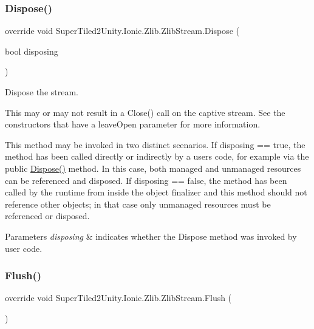 \subsubsection{\texorpdfstring{Dispose()}{Dispose()}}
{\footnotesize\ttfamily override void Super\+Tiled2\+Unity.\+Ionic.\+Zlib.\+Zlib\+Stream.\+Dispose (\begin{DoxyParamCaption}\item[{bool}]{disposing }\end{DoxyParamCaption})\hspace{0.3cm}{\ttfamily [protected]}}



Dispose the stream. 

This may or may not result in a {\ttfamily Close()} call on the captive stream. See the constructors that have a {\ttfamily leave\+Open} parameter for more information. 

This method may be invoked in two distinct scenarios. If disposing == true, the method has been called directly or indirectly by a user\textquotesingle{}s code, for example via the public \mbox{\hyperlink{class_super_tiled2_unity_1_1_ionic_1_1_zlib_1_1_zlib_stream_ae7e46e815fe6d5cd5777c4388a096ca2}{Dispose()}} method. In this case, both managed and unmanaged resources can be referenced and disposed. If disposing == false, the method has been called by the runtime from inside the object finalizer and this method should not reference other objects; in that case only unmanaged resources must be referenced or disposed. 


\begin{DoxyParams}{Parameters}
{\em disposing} & indicates whether the Dispose method was invoked by user code. \\
\hline
\end{DoxyParams}
\mbox{\label{class_super_tiled2_unity_1_1_ionic_1_1_zlib_1_1_zlib_stream_af13e6fb7438e8b9a1a77ec89aabedeef}} 
\subsubsection{\texorpdfstring{Flush()}{Flush()}}
{\footnotesize\ttfamily override void Super\+Tiled2\+Unity.\+Ionic.\+Zlib.\+Zlib\+Stream.\+Flush (\begin{DoxyParamCaption}{ }\end{DoxyParamCaption})}



